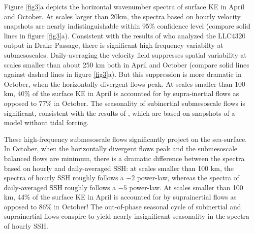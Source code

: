 \documentclass[grl]{agutex2015}
\begin{document}
\begin{article}
Figure \ref{fig3}a depicts the horizontal wavenumber spectra of surface KE in
April and October. At scales larger than 20km, the spectra based on hourly
velocity snapshots are nearly indistinguishable within 95$\%$ confidence level
(compare solid lines in figure \ref{fig3}a). Consistent with the results of
\citet{rocha_etal2016} who analyzed the LLC4320 output in Drake Passage,
there is significant high-frequency variabilty at submesoscales. Daily-averaging
the velocity field suppresses spatial variability at scales smaller than about 250
km both in April and October (compare solid lines against dashed lines in figure
\ref{fig3}a). But this suppression is more dramatic in October, when the horizontally
divergent flows peak. At scales
smaller than 100 km, 40$\%$ of the surface KE in April is accounted for by supra-inertial
flows as opposed to 77$\%$ in October. The seasonality of subinertial submesoscale flows
is significant, consistent with the results of \citet{sasaki_etal2014}, which are
based on snapshots of a model without tidal forcing.

These high-frequency submesoscale flows significantly project on the sea-surface.
In October, when the horizontally divergent flows peak and the submesoscale
balanced flows are minimum, there is a dramatic difference between the spectra
based on hourly and daily-averaged SSH: at scales smaller than 100 km, the spectra
of hourly SSH roughly follows a $-2$ power-law, whereas the spectra of daily-averaged
SSH roughly follows a $-5$ power-law. At scales
smaller than 100 km, 44$\%$ of the surface KE in April is accounted for by suprainertial
flows as opposed to 86$\%$ in October! The out-of-phase seasonal cycle of subinertial
and suprainertial flows conspire to yield nearly insignificant seasonality in the spectra
of hourly SSH.

%
%
%





\end{article}
\end{document}

